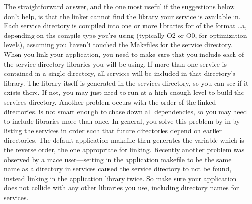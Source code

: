 The straightforward answer, and the one most useful if the suggestions
below don't help, is that the linker cannot find the library your
service is available in.  Each service directory is compiled into one or
more libraries for of the format
..a, depending on the
compile type you're using (typically O2 or O0, for optimization levels),
assuming you haven't touched the Makefiles for the service directory.
When you link your application, you need to make sure that you include
each of the service directory libraries you will be using.  If more than
one service is contained in a single directory, all services will be
included in that directory's library.  The library itself is generated
in the services directory, so you can see if it exists there.  If not,
you may just need to run  at a high enough level to build
the services directory.  Another problem occurs with the order of the
linked directories.   is not smart enough to chase down all
dependencies, so you may need to include libraries more than once.  In
general, you solve this problem by in
 by listing the services in order
such that future directories depend on earlier directories.  The default
application makefile then generates the 
variable which is the reverse order, the one appropriate for linking.
Recently another problem was observed by a mace user---setting
 in the application makefile to be the same name
as a directory in services caused the service directory to not be found,
instead linking in the application library twice.  So make sure your
application  does not collide with any other
libraries you use, including directory names for services.

